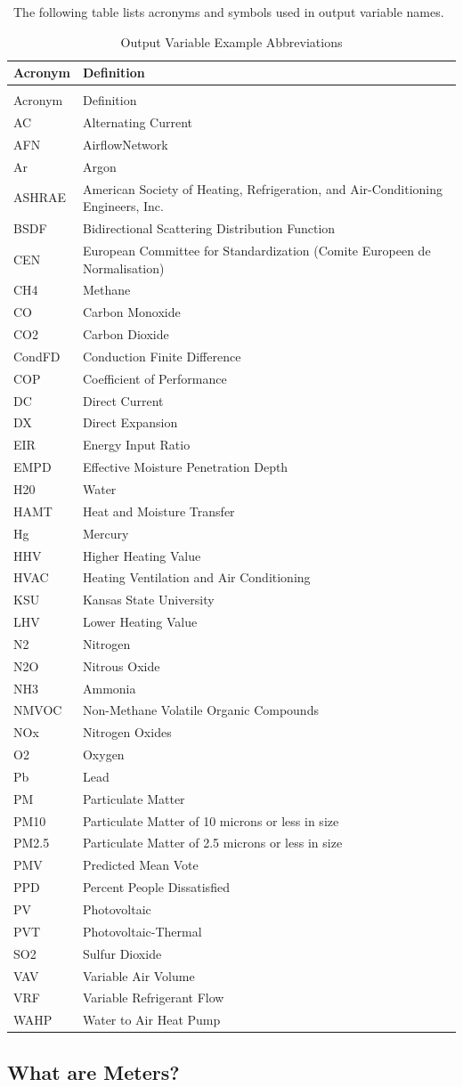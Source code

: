 ~The following table lists acronyms and symbols used in output variable names.


\begin{longtable}[c]{p{1.5in}p{4.5in}}
\caption{Output Variable Example Abbreviations \label{table:output-variable-example-abbreviations}} \tabularnewline
\toprule
Acronym & Definition \tabularnewline
\midrule
\endfirsthead

\caption[]{Output Variable Example Abbreviations} \tabularnewline
\toprule
Acronym & Definition \tabularnewline
\midrule
\endhead
AC & Alternating Current\tabularnewline
AFN & AirflowNetwork\tabularnewline
Ar & Argon\tabularnewline
ASHRAE & American Society of Heating, Refrigeration, and Air-Conditioning Engineers, Inc.\tabularnewline
BSDF & Bidirectional Scattering Distribution Function\tabularnewline
CEN & European Committee for Standardization (Comite Europeen de Normalisation)\tabularnewline
CH4 & Methane\tabularnewline
CO & Carbon Monoxide\tabularnewline
CO2 & Carbon Dioxide\tabularnewline
CondFD & Conduction Finite Difference\tabularnewline
COP & Coefficient of Performance\tabularnewline
DC & Direct Current\tabularnewline
DX & Direct Expansion\tabularnewline
EIR & Energy Input Ratio\tabularnewline
EMPD & Effective Moisture Penetration Depth\tabularnewline
H20 & Water\tabularnewline
HAMT & Heat and Moisture Transfer\tabularnewline
Hg & Mercury\tabularnewline
HHV & Higher Heating Value\tabularnewline
HVAC & Heating Ventilation and Air Conditioning\tabularnewline
KSU & Kansas State University\tabularnewline
LHV & Lower Heating Value\tabularnewline
N2 & Nitrogen\tabularnewline
N2O & Nitrous Oxide\tabularnewline
NH3 & Ammonia\tabularnewline
NMVOC & Non-Methane Volatile Organic Compounds\tabularnewline
NOx & Nitrogen Oxides\tabularnewline
O2 & Oxygen\tabularnewline
Pb & Lead\tabularnewline
PM & Particulate Matter\tabularnewline
PM10 & Particulate Matter of 10 microns or less in size\tabularnewline
PM2.5 & Particulate Matter of 2.5 microns or less in size\tabularnewline
PMV & Predicted Mean Vote\tabularnewline
PPD & Percent People Dissatisfied\tabularnewline
PV & Photovoltaic\tabularnewline
PVT & Photovoltaic-Thermal\tabularnewline
SO2 & Sulfur Dioxide\tabularnewline
VAV & Variable Air Volume\tabularnewline
VRF & Variable Refrigerant Flow\tabularnewline
WAHP & Water to Air Heat Pump\tabularnewline
\bottomrule
\end{longtable}


\subsection{What are Meters?}\label{what-are-meters}

